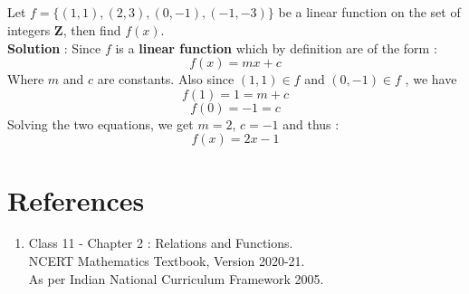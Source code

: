 \documentclass[12pt, letterpaper]{article}
\begin{document}
\subsection{}
Let $f = \{(1,1), (2,3), (0,-1), (-1,-3)\}$ be a linear function on the set of integers $\mathbf{Z}$, then find $f(x)$.\\
\textbf{Solution} : Since $f$ is a \textbf{linear function} which by definition are of the form : 
\begin{displaymath}
f(x) = mx + c
\end{displaymath}
Where $m$ and $c$ are constants. Also since $(1,1) \in f$ and $(0,-1) \in f$ , we have 
\begin{displaymath}
f(1) = 1 = m + c
\end{displaymath}
\begin{displaymath}
f(0) = -1 = c
\end{displaymath}
Solving the two equations, we get $m = 2$, $c = -1$ and thus : 
\begin{displaymath}
f(x) = 2x-1
\end{displaymath}  

\section{References}
\begin{enumerate}
    \item Class 11 - Chapter 2 : Relations and Functions.\\ 
    NCERT Mathematics Textbook, Version 2020-21.\\
    As per Indian National Curriculum Framework 2005.
\end{enumerate}
\end{document}
